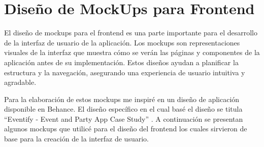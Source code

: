 \section{Diseño de MockUps para Frontend}

El diseño de mockups para el frontend es una parte importante para el desarrollo de la interfaz de usuario de la aplicación. Los mockups son representaciones visuales de la interfaz que muestra cómo se verán las páginas y componentes de la aplicación antes de su implementación. Estos diseños ayudan a planificar la estructura y la navegación, asegurando una experiencia de usuario intuitiva y agradable. 

Para la elaboración de estos mockups me inspiré en un diseño de aplicación disponible en Behance. El diseño específico en el cual basé el diseño se titula “Eventify - Event and Party App Case Study” \cite{polina_rusenova}. A continuación se presentan algunos mockups que utilicé para el diseño del frontend los cuales sirvieron de base para la creación de la interfaz de usuario.

